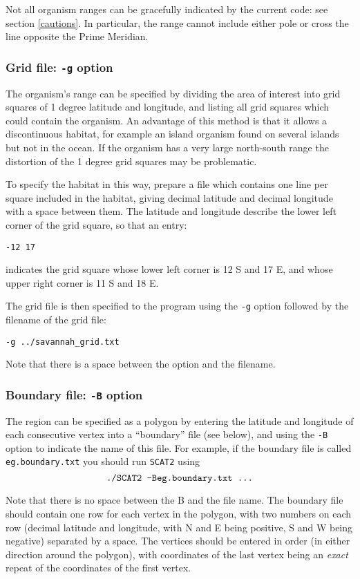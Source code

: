 \documentclass[10pt,titlepage,times,letterpaper]{article}
\def\SCAT{{\tt SCAT2} }
\begin{document}
Not all organism ranges can be gracefully indicated by the current code:
see section \ref{cautions}.  In particular, the range cannot include either pole
or cross the line opposite the Prime Meridian.

\subsubsection{Grid file:  {\tt -g} option}

The organism's range can be specified by dividing the area of interest into grid
squares of 1 degree latitude and longitude, and listing all grid squares which could
contain the organism.  An advantage of this method is that it allows a discontinuous
habitat, for example an island organism found on several islands but not in the ocean.
If the organism has a very large 
north-south range the distortion of the 1 degree grid squares may be problematic.

To specify the habitat in this way, prepare a file which contains one line per
square included in the habitat, giving decimal latitude and decimal longitude with
a space between them.  The latitude and longitude describe the lower left corner of
the grid square, so that an entry:

{\tt -12 17}

indicates the grid square whose lower left corner is 12 S and 17 E, and whose upper right 
corner is 11 S and 18 E.

The grid file is then specified to the program using the {\tt -g} option followed
by the filename of the grid file:

{\tt -g ../savannah\_grid.txt}

Note that there is a space between the option and the filename.

\subsubsection{Boundary file:  {\tt -B} option}
The region can be specified as a polygon by entering the latitude and longitude of
each consecutive vertex into a ``boundary'' file (see below), and using
the {\tt -B} option to indicate the name of this file.
For example, if the boundary file is called {\tt eg.boundary.txt} you
should run \SCAT using
$$\text{\tt ./SCAT2 -Beg.boundary.txt ...}$$ 

Note that there is no space between the B and the file name.
The boundary file should contain one row for each vertex in the
polygon, with two numbers on each row (decimal latitude and longitude,
with N and E being positive, S and W being negative) separated by a
space. The vertices should be entered in order (in either direction
around the polygon), with coordinates of the last vertex being an {\it
exact} repeat of the coordinates of the first vertex.
\end{document}
